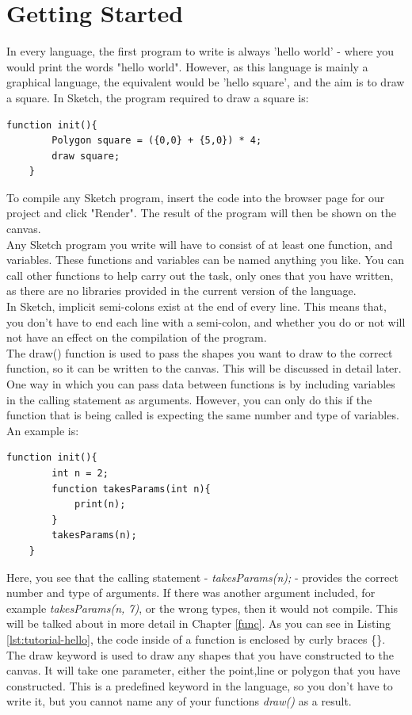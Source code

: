 \documentclass{l3proj}
\begin{document}
\section{Getting Started}
\label{start}
In every language, the first program to write is always 'hello world' - where you would print the words "hello world". However, as this language is mainly a graphical language, the equivalent would be 'hello square', and the aim is to draw a square. In Sketch, the program required to draw a square is:\\
\lstset{%
      basicstyle=\ttfamily\footnotesize\bfseries,
      xleftmargin=.1\textwidth, xrightmargin=.1\textwidth,
      captionpos=b,
      tabsize=4
    }
\begin{lstlisting}[caption={Hello Square},label={lst:tutorial-hello}]
    function init(){
        Polygon square = ({0,0} + {5,0}) * 4;
        draw square;
    }
\end{lstlisting}
To compile any Sketch program, insert the code into the browser page for our project and click "Render". The result of the program will then be shown on the canvas.
\\ [12pt]
Any Sketch program you write will have to consist of at least one function, and variables. These functions and variables can be named anything you like. You can call other functions to help carry out the task, only ones that you have written, as there are no libraries provided in the current version of the language. 
\\ [12pt]
In Sketch, implicit semi-colons exist at the end of every line. This means that, you don't have to end each line with a semi-colon, and whether you do or not will not have an effect on the compilation of the program. 
\\ [12pt]
The draw() function is used to pass the shapes you want to draw to the correct function, so it can be written to the canvas. This will be discussed in detail later.
\\ [12pt]
One way in which you can pass data between functions is by including variables in the calling statement as arguments. However, you can only do this if the function that is being called is expecting the same number and type of variables. An example is:
\begin{lstlisting}[caption={Function Parameters},label={lst:tutorial-parameters}]
    function init(){
        int n = 2;
        function takesParams(int n){
            print(n);
        }
        takesParams(n);
    }
\end{lstlisting}
Here, you see that the calling statement - \textit{takesParams(n);} - provides the correct number and type of arguments. If there was another argument included, for example \textit{takesParams(n, 7)}, or the wrong types, then it would not compile. This will be talked about in more detail in Chapter \ref{func}. As you can see in Listing \ref{lst:tutorial-hello}, the code inside of a function is enclosed by curly braces \{\}. The draw keyword is used to draw any shapes that you have constructed to the canvas. It will take one parameter, either the point,line or polygon that you have constructed. This is a predefined keyword in the language, so you don't have to write it, but you cannot name any of your functions \textit{draw()} as a result. 
\end{document}
